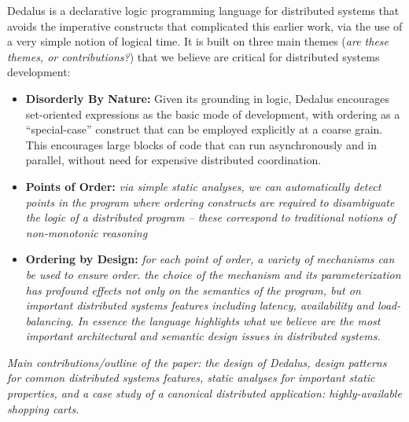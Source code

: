 Dedalus is a declarative logic programming language for distributed systems that avoids the imperative constructs that complicated this earlier work, via the use of a very simple notion of logical time.  It is built on three main themes ({\em are these themes, or contributions?}) that we believe are critical for distributed systems development:
\begin{itemize}
    \item {\bf Disorderly By Nature:} Given its grounding in logic, Dedalus encourages set-oriented expressions as the basic mode of development, with ordering as a ``special-case'' construct that can be employed explicitly at a coarse grain.  This encourages large blocks of code that can run asynchronously and in parallel, without need for expensive distributed coordination.
    \item {\bf Points of Order:} {\em via simple static analyses, we can automatically detect points in the program where ordering constructs are required to disambiguate the logic of a distributed program -- these correspond to traditional notions of non-monotonic reasoning}  
    \item {\bf Ordering by Design:} {\em for each point of order, a variety of mechanisms can be used to ensure order.  the choice of the mechanism and its parameterization has profound effects not only on the semantics of the program, but on important distributed systems features including latency, availability and load-balancing.  In essence the language highlights what we believe are the most important architectural and semantic design issues in distributed systems. }
\end{itemize}

\emph{Main contributions/outline of the paper: the design of Dedalus, design patterns for common distributed systems features, static analyses for important static properties, and a case study of a canonical distributed application: highly-available shopping carts.}